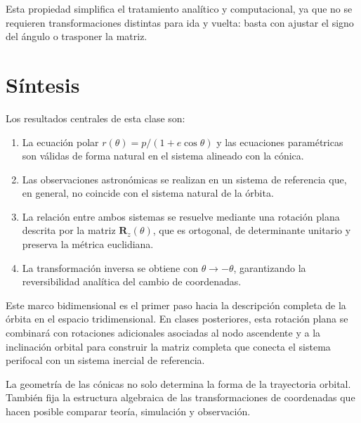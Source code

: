 Esta propiedad simplifica el tratamiento analítico y computacional, ya que no se requieren transformaciones distintas para ida y vuelta: basta con ajustar el signo del ángulo o trasponer la matriz.

\section{Síntesis}
Los resultados centrales de esta clase son:
\begin{enumerate}
    \item La ecuación polar \(r(\theta) = p/(1+e\cos\theta)\) y las ecuaciones paramétricas son válidas de forma natural en el sistema alineado con la cónica.
    \item Las observaciones astronómicas se realizan en un sistema de referencia que, en general, no coincide con el sistema natural de la órbita.
    \item La relación entre ambos sistemas se resuelve mediante una rotación plana descrita por la matriz \(\mathbf{R}_z(\theta)\), que es ortogonal, de determinante unitario y preserva la métrica euclidiana.
    \item La transformación inversa se obtiene con \(\theta \to -\theta\), garantizando la reversibilidad analítica del cambio de coordenadas.
\end{enumerate}

Este marco bidimensional es el primer paso hacia la descripción completa de la órbita en el espacio tridimensional. En clases posteriores, esta rotación plana se combinará con rotaciones adicionales asociadas al nodo ascendente y a la inclinación orbital para construir la matriz completa que conecta el sistema perifocal con un sistema inercial de referencia.

\begin{importante}
La geometría de las cónicas no solo determina la forma de la trayectoria orbital. También fija la estructura algebraica de las transformaciones de coordenadas que hacen posible comparar teoría, simulación y observación.
\end{importante}